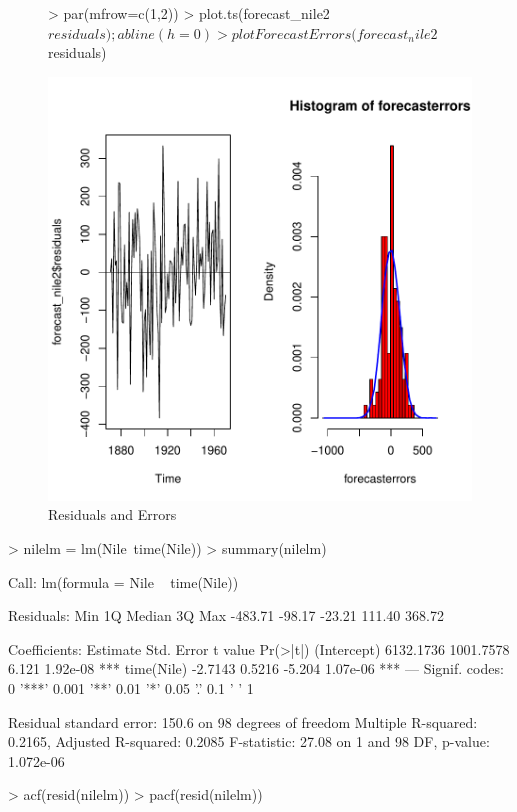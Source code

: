 \documentclass[11pt, a4paper]{article} %
\begin{document}
\begin{figure}
\centering
\begin{Schunk}
\begin{Sinput}
> par(mfrow=c(1,2))
> plot.ts(forecast_nile2$residuals); abline(h=0)
> plotForecastErrors(forecast_nile2$residuals)
\end{Sinput}
\end{Schunk}
\includegraphics{alles-046}
\caption{Residuals and Errors}
\end{figure}

\begin{Schunk}
\begin{Sinput}
> nilelm = lm(Nile~time(Nile))
> summary(nilelm)
\end{Sinput}
\begin{Soutput}
Call:
lm(formula = Nile ~ time(Nile))

Residuals:
    Min      1Q  Median      3Q     Max 
-483.71  -98.17  -23.21  111.40  368.72 

Coefficients:
             Estimate Std. Error t value Pr(>|t|)    
(Intercept) 6132.1736  1001.7578   6.121 1.92e-08 ***
time(Nile)    -2.7143     0.5216  -5.204 1.07e-06 ***
---
Signif. codes:  0 '***' 0.001 '**' 0.01 '*' 0.05 '.' 0.1 ' ' 1

Residual standard error: 150.6 on 98 degrees of freedom
Multiple R-squared:  0.2165,	Adjusted R-squared:  0.2085 
F-statistic: 27.08 on 1 and 98 DF,  p-value: 1.072e-06
\end{Soutput}
\begin{Sinput}
> acf(resid(nilelm))
> pacf(resid(nilelm))
\end{Sinput}
\end{Schunk}
\end{document}

